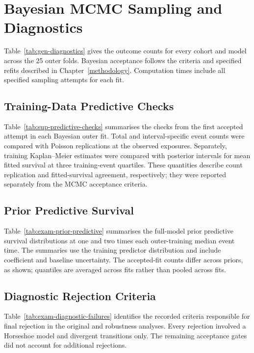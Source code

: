 \chapter{Bayesian MCMC Sampling and Diagnostics}\label{appendix-f-bayesian-mcmc-sampling-and-diagnostics}\label{app:diagnostics}

Table~\ref{tab:gen-diagnostics} gives the outcome counts for every cohort and model across the 25 outer folds. Bayesian acceptance follows the criteria and specified refits described in Chapter~\ref{methodology}. Computation times include all specified sampling attempts for each fit.



\section{Training-Data Predictive Checks}

Table~\ref{tab:sup-predictive-checks} summarises the checks from the first accepted attempt in each Bayesian outer fit. Total and interval-specific event counts were compared with Poisson replications at the observed exposures. Separately, training Kaplan--Meier estimates were compared with posterior intervals for mean fitted survival at three training-event quartiles. These quantities describe count replication and fitted-survival agreement, respectively; they were reported separately from the MCMC acceptance criteria.




\section{Prior Predictive Survival}

Table~\ref{tab:exam-prior-predictive} summarises the full-model prior predictive survival distributions at one and two times each outer-training median event time. The summaries use the training predictor distribution and include coefficient and baseline uncertainty. The accepted-fit counts differ across priors, as shown; quantiles are averaged across fits rather than pooled across fits.



\section{Diagnostic Rejection Criteria}

Table~\ref{tab:exam-diagnostic-failures} identifies the recorded criteria responsible for final rejection in the original and robustness analyses. Every rejection involved a Horseshoe model and divergent transitions only. The remaining acceptance gates did not account for additional rejections.


